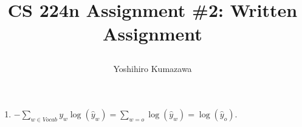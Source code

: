 \documentclass[12pt]{article}
\title{
  \vspace{-2cm}
  CS 224n Assignment \#2: Written Assignment \\
  \author{Yoshihiro Kumazawa}
}
\begin{document}
\maketitle
\begin{enumerate}[label=(\alph*)]
\item $-\sum_{w\in Vocab}y_w\log(\hat{y}_w)=\sum_{w=o}\log(\hat{y}_w)=\log(\hat{y}_o)$.
\end{enumerate}
\end{document}
